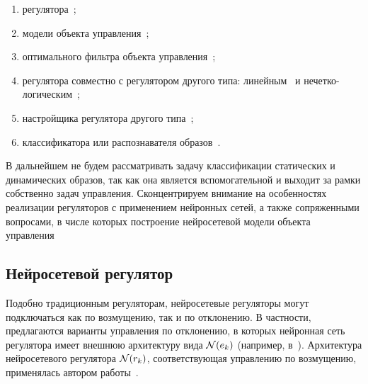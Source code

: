 \begin{enumerate}

\item
регулятора~\cite{sigom00}\cite{khomyu96}\cite{kav96}\cite{bouchard01}\cite{linwaihong01}\cite{gorfeld96}\cite{tukin01}\cite{pican95}\cite{golovko01}\cite{fabri98};

\item
модели объекта управления~\cite{narmuk96}\cite{park96}\cite{levinar95}\cite{kulee96};

\item
оптимального фильтра объекта управления~\cite{hayyeeder97};

\item
регулятора совместно с регулятором другого типа:
линейным~\cite{steck96}\cite{sigom00} \cite{chenmills97} и
нечетко-логическим~\cite{sigom00}\cite{wailinlin00}\cite{linwaihong01};

\item
настройщика регулятора другого типа~\cite{sigom00}\cite{samtar96};

\item
классификатора или распознавателя
образов~\cite{uhrig91}\cite{zhuchkov02}\cite{basubart94}\cite{golovko01}.

\end{enumerate}

В дальнейшем не будем рассматривать задачу классификации статических и
динамических образов, так как она является вспомогательной и выходит
за рамки собственно задач управления.  Сконцентрируем внимание на
особенностях реализации регуляторов с применением нейронных сетей, а
также сопряженными вопросами, в числе которых построение нейросетевой
модели объекта управления

\subsection{Нейросетевой регулятор}


Подобно традиционным регуляторам, нейросетевые регуляторы могут
подключаться как по возмущению, так и по отклонению.  В частности,
предлагаются варианты управления по отклонению, в которых нейронная
сеть регулятора имеет внешнюю архитектуру вида $\mathcal{N}(e_k)$ (например,
в~\cite{ronco98}).
Архитектура нейросетевого регулятора $\mathcal{N}(r_k)$, соответствующая
управлению по возмущению, применялась автором работы~\cite{khomyu96}.

